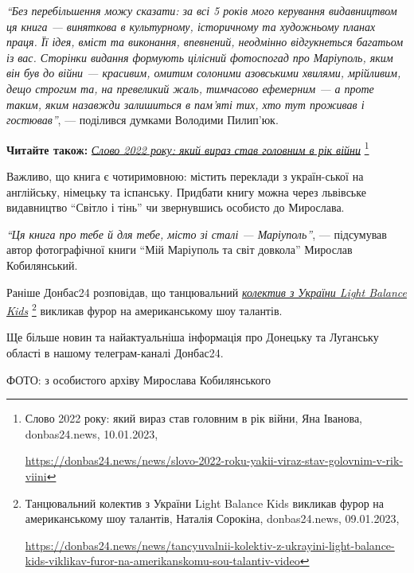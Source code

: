 \begin{leftbar}
\emph{\enquote{Без перебільшення можу сказати: за всі 5 років мого керування видавництвом
ця книга — виняткова в культурному, історичному та художньому планах
праця. Її ідея, вміст та виконання, впевнений, неодмінно відгукнеться
багатьом із вас. Сторінки видання формують цілісний фотоспогад про
Маріуполь, яким він був до війни — красивим, омитим солоними азовськими
хвилями, мрійливим, дещо строгим та, на превеликий жаль, тимчасово
ефемерним — а проте таким, яким назавжди залишиться в пам'яті тих, хто
тут проживав і гостював}}, — поділився думками Володими Пилип'юк.
\end{leftbar}

\textbf{Читайте також:} \href{https://donbas24.news/news/slovo-2022-roku-yakii-viraz-stav-golovnim-v-rik-viini}{\emph{Слово 2022 року: який вираз став головним в рік війни}}%
\footnote{Слово 2022 року: який вираз став головним в рік війни, Яна Іванова, donbas24.news, 10.01.2023, \par%
\url{https://donbas24.news/news/slovo-2022-roku-yakii-viraz-stav-golovnim-v-rik-viini}%
}


Важливо, що книга є чотиримовною: містить переклади з україн\hyp{}ської на
англійську, німецьку та іспанську. Придбати книгу можна через львівське
видавництво \enquote{Світло і тінь} чи звернувшись особисто до Мирослава.

\begin{leftbar}
\emph{\enquote{Ця книга про тебе й для тебе, місто зі сталі — Маріуполь}}, — підсумував автор
фотографічної книги \enquote{Мій Маріуполь та світ довкола} Мирослав Кобилянський.
\end{leftbar}


Раніше Донбас24 розповідав, що танцювальний \href{https://donbas24.news/news/tancyuvalnii-kolektiv-z-ukrayini-light-balance-kids-viklikav-furor-na-amerikanskomu-sou-talantiv-video}{\emph{колектив з України Light Balance
Kids}}%
\footnote{Танцювальний колектив з України Light Balance Kids викликав фурор на американському шоу талантів, Наталія Сорокіна, donbas24.news, 09.01.2023, \par\url{https://donbas24.news/news/tancyuvalnii-kolektiv-z-ukrayini-light-balance-kids-viklikav-furor-na-amerikanskomu-sou-talantiv-video}}
викликав фурор на американському шоу талантів.

Ще більше новин та найактуальніша інформація про Донецьку та Луганську області
в нашому телеграм-каналі Донбас24.

ФОТО: з особистого архіву Мирослава Кобилянського

